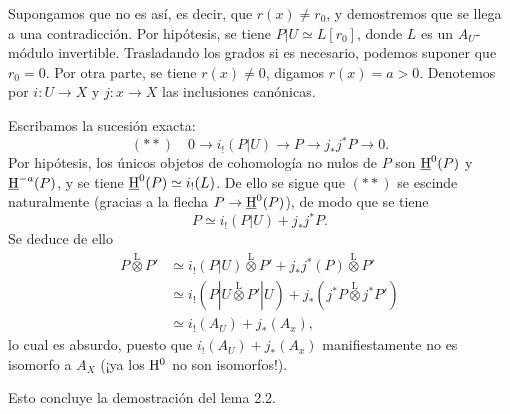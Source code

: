 Supongamos que no es así, es decir, que $r(x) \neq r_0$, y demostremos que se llega a una contradicción. Por hipótesis, se tiene $P|U \simeq L[r_0]$, donde $L$ es un $A_U$-módulo invertible. Trasladando los grados si es necesario, podemos suponer que $r_0 = 0$. Por otra parte, se tiene $r(x) \neq 0$, digamos $r(x) = a > 0$. Denotemos por $i : U \to X$ y $j : x \to X$ las inclusiones canónicas.

Escribamos la sucesión exacta:
\[
(**) \quad 0 \longrightarrow i_{!}(P|U) \longrightarrow P \longrightarrow j_{*}j^{*}P \longrightarrow 0.
\]
Por hipótesis, los únicos objetos de cohomología no nulos de $P$ son $\underline{\mathrm H}^{0}(P)$ y $\underline{\mathrm H}^{-a}(P)$, y se tiene $\underline{\mathrm H}^{0}(P) \simeq i_{!}(L)$. De ello se sigue que $(**)$ se escinde naturalmente (gracias a la flecha $P \to \underline{\mathrm H}^{0}(P)$), de modo que se tiene
\[
P \simeq i_{!}(P|U) + j_{*}j^{*}P.
\]
Se deduce de ello
\begin{align*}
P \mathop{\otimes}\limits^{\mathrm{L}} P' &\simeq i_{!}(P|U) \mathop{\otimes}\limits^{\mathrm{L}} P' + j_{*}j^{*}(P) \mathop{\otimes}\limits^{\mathrm{L}} P' \\
&\simeq i_{!}(P|U \mathop{\otimes}\limits^{\mathrm{L}} P'|U) + j_{*}(j^{*}P \mathop{\otimes}\limits^{\mathrm{L}} j^{*}P') \\
&\simeq i_{!}(A_U) + j_{*}(A_x),
\end{align*}
lo cual es absurdo, puesto que $i_{!}(A_U) + j_{*}(A_x)$ manifiestamente no es isomorfo a $A_X$ (¡ya los $\mathrm{H}^{0}$ no son isomorfos!).

Esto concluye la demostración del lema 2.2.
